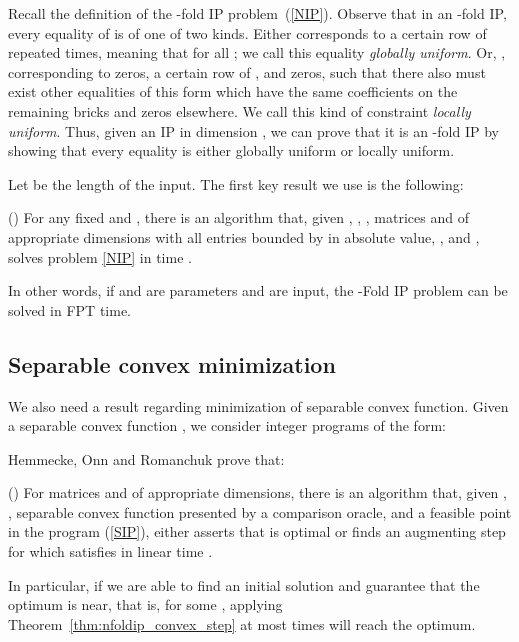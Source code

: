 \documentclass{llncs}
\newcommand{\FPT}{{\sf FPT}\xspace}
\begin{document}
Recall the definition of the -fold IP problem~(\ref{NIP}). Observe that in an -fold IP, every equality  of  is of one of two kinds. Either  corresponds to a certain row  of  repeated  times, meaning that  for all ; we call this equality \textit{globally uniform}. Or, , corresponding to  zeros, a certain row  of , and  zeros, such that there also must exist  other equalities of this form which have the same coefficients  on the remaining  bricks and zeros elsewhere. We call this kind of constraint \textit{locally uniform}. Thus, given an IP in dimension , we can prove that it is an -fold IP by showing that every equality is either globally uniform or locally uniform.

Let  be the length of the input. The first key result we use is the following:

\begin{theorem}{(\cite[Theorem 6.1]{HemmeckeOR:13})}\label{thm:nfoldip}
For any fixed  and , there is an algorithm that,
given , , , matrices  and  of appropriate dimensions with all entries
bounded by  in absolute value, , and , solves problem \eqref{NIP} in time .

\end{theorem}

In other words, if  and  are parameters and  are input, the -Fold IP problem can be solved in \FPT time.

\subsection{Separable convex minimization}

We also need a result regarding minimization of separable convex function. Given a separable convex function , we consider integer programs of the form:



Hemmecke, Onn and Romanchuk prove that:

\begin{theorem}{(\cite[Theorem 4.1]{HemmeckeOR:13})}\label{thm:nfoldip_convex_step}
For matrices  and  of appropriate dimensions, there is an algorithm that, given ,
, separable convex function  presented by a comparison oracle,
and a feasible point  in the program (\ref{SIP}), either asserts
that  is optimal or finds an augmenting step 
for  which satisfies  in linear time .
\end{theorem}

In particular, if we are able to find an initial solution  and guarantee that the optimum  is near, that is,  for some , applying Theorem~\ref{thm:nfoldip_convex_step} at most  times will reach the optimum.
\end{document}
